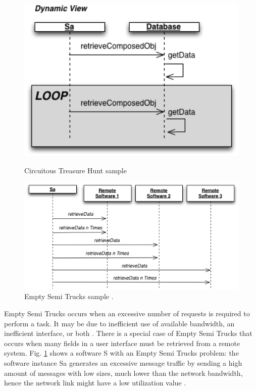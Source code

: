 \documentclass[espaco=umemeio,chapter=TITLE,twoside,openright]{abnt}
\begin{document}
\begin{figure}[h]
\begin{minipage}{.5\textwidth}
\centering
\includegraphics[width=1\textwidth]{./images/circuit.png}
\caption{Circuitous
Treasure Hunt sample \cite{Vetoio2011}}
\label{fig:circuit}
\end{minipage}
\begin{minipage}{.5\textwidth}
\centering
\includegraphics[width=1.2\textwidth]{./images/trucks2.png}
\caption{Empty Semi Trucks sample \cite{Vetoio2011}.}
\label{fig:trucks}
\end{minipage}
\end{figure}

Empty Semi Trucks occurs when an excessive number of requests is required to perform a task. It may be due to inefficient use of available bandwidth, an inefficient interface, or both \cite{Arcelli2012}. There is a special case of Empty Semi Trucks that occurs  when many fields in a user interface must be retrieved from a
remote system. Fig. \ref{fig:trucks} shows a software S with an Empty Semi Trucks problem: the software instance Sa generates an excessive message traffic by sending a high amount of messages with low sizes, much lower than the network bandwidth, hence the network link might have a low utilization value \cite{Vetoio2011}.
\end{document}
